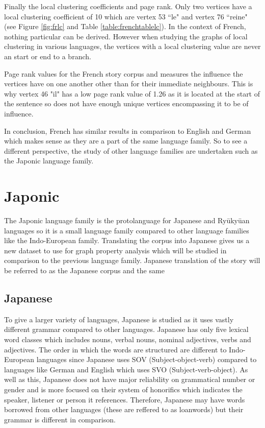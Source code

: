 Finally the local clustering coefficients and page rank. Only two vertices have a local clustering coefficient of 10 which are vertex 53 ``le" and vertex 76 ``reine" (see Figure \ref{fig:frlc} and Table \ref{table:frenchtablelc}). In the context of French, nothing particular can be derived. However when studying the graphs of local clustering in various languages, the vertices with a local clustering value are never an start or end to a branch.

 Page rank values for the French story corpus and measures the influence the vertices have on one another other than for their immediate neighbours. This is why vertex 46 "il" has a low page rank value of 1.26 as it is located at the start of the sentence so does not have enough unique vertices encompassing it to be of influence.

In conclusion, French has similar results in comparison to English and German which makes sense as they are a part of the same language family. So to see a different perspective, the study of other language families are undertaken such as the Japonic language family.

\section{Japonic}
The Japonic language family is the protolanguage for Japanese and Ryūkyūan languages\cite{vovin2017origins} so it is a small language family compared to other language families like the Indo-European family. Translating the corpus into Japanese gives us a new dataset to use for graph property analysis which will be studied in comparison to the previous language family. Japanese translation of the story will be referred to as the Japanese corpus and the same 
\subsection{Japanese}
To give a larger variety of languages, Japanese is studied as it uses vastly different grammar compared to other languages. Japanese has only five lexical word classes which includes nouns, verbal nouns, nominal adjectives, verbs and adjectives. The order in which the words are structured are different to Indo-European languages since Japanese uses SOV (Subject-object-verb) compared to languages like German and English which uses SVO (Subject-verb-object). As well as this, Japanese does not have major reliability on grammatical number or gender and is more focused on their system of honorifics which indicates the speaker, listener or person it references. Therefore, Japanese may have words borrowed from other languages (these are reffered to as loanwords\cite{miura1979influence}) but their grammar is different in comparison. 

